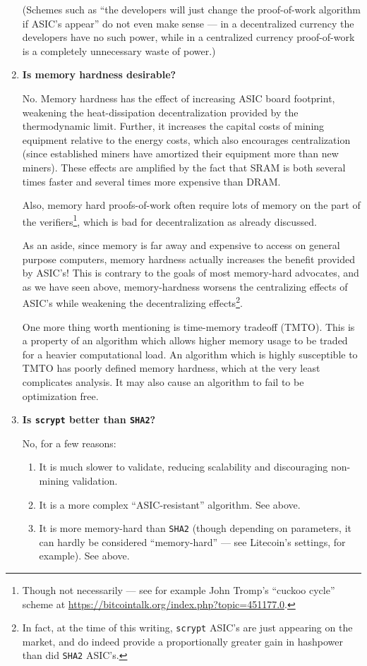 \documentclass[letterpaper]{article}
\theoremstyle{xxx}
\theoremstyle{evil}
\theoremstyle{yyy}
\theoremstyle{plain}
\theoremstyle{zzz}
\begin{document}
\begin{enumerate}
(Schemes such as ``the developers will just change the proof-of-work
algorithm if ASIC's appear'' do not even make sense --- in a decentralized
currency the developers have no such power, while in a centralized
currency proof-of-work is a completely unnecessary waste of power.)

\item \textbf{Is memory hardness desirable?}

No. Memory hardness has the effect of increasing ASIC board footprint,
weakening the heat-dissipation decentralization provided by the
thermodynamic limit. Further, it increases the capital costs of
mining equipment relative to the energy costs, which also encourages
centralization (since established miners have amortized their equipment
more than new miners). These effects are amplified by the fact that
SRAM is both several times faster and several times more expensive
than DRAM.

Also, memory hard proofs-of-work often require lots of memory on the
part of the verifiers\footnote{Though not necessarily --- see for example
John Tromp's ``cuckoo cycle'' scheme at \url{https://bitcointalk.org/index.php?topic=451177.0}.},
which is bad for decentralization as already discussed.

As an aside, since memory is far away and expensive to access on general
purpose computers, memory hardness actually increases the benefit provided
by ASIC's! This is contrary to the goals of most memory-hard advocates,
and as we have seen above, memory-hardness worsens the centralizing effects
of ASIC's while weakening the decentralizing effects\footnote{In fact, at
the time of this writing, \texttt{scrypt} ASIC's are just appearing on the
market, and do indeed provide a proportionally greater gain in hashpower
than did \texttt{SHA2} ASIC's.}.

One more thing worth mentioning is time-memory tradeoff (TMTO). This is
a property of an algorithm which allows higher memory usage to be traded
for a heavier computational load. An algorithm which is highly susceptible
to TMTO has poorly defined memory hardness, which at the very least
complicates analysis. It may also cause an algorithm to fail to be optimization
free.

\item \textbf{Is \texttt{scrypt} better than \texttt{SHA2}?}

No, for a few reasons:
\begin{enumerate}
\item It is much slower to validate, reducing scalability and discouraging
non-mining validation.
\item It is a more complex ``ASIC-resistant'' algorithm. See above.
\item It is more memory-hard than \texttt{SHA2} (though depending on parameters,
it can hardly be considered ``memory-hard'' --- see Litecoin's settings, for
example). See above.
\end{enumerate}


\end{enumerate}
\end{document}

